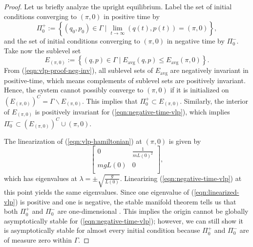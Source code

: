 \begin{proof}
   Let us briefly analyze the upright equilibrium.
   Label the set of initial conditions converging to \((\pi, 0)\) in
   positive time by
   \[
      \Pi_0^+ := \left\{ (q_0,p_0) \in \Gamma \mid \lim_{t \to \infty} (q(t),p(t)) = (\pi, 0) \right\}
      ,
   \]
   and the set of initial conditions converging to \((\pi,0)\)
   in negative time by \(\Pi_0^-\).
   Take now the sublevel set
   \[
      E_{(\pi,0)} := \left\{ (q,p) \in \Gamma \mid E_\text{avg}(q,p) \leq
         E_\text{avg}(\pi,0) \right\}
      .
   \] 
   From (\ref{eqn:vlp-proof-neg-inv}), all sublevel sets of \(E_\text{avg}\) are
   negatively invariant in positive-time, which means
   complements of sublevel sets are positively invariant.
   Hence, the system cannot possibly converge to \((\pi,0)\) if it is
   initialized on 
   \(\left(E_{(\pi,0)}\right)^C = \Gamma \backslash E_{(\pi,0)}\).
   This implies that \(\Pi_0^+ \subset E_{(\pi,0)}\).
   Similarly, the interior of \(E_{(\pi,0)}\) is positively
   invariant for (\ref{eqn:negative-time-vlp}), 
   which implies \(\Pi_0^- \subset \left(E_{(\pi,0)}\right)^C \cup (\pi,0)\).

   The linearization of (\ref{eqn:vlp-hamiltonian}) at \((\pi, 0)\) is given by
   \begin{equation}\label{eqn:linearized-vlp}
      \begin{bmatrix}
         0 & \frac{1}{mL(0)^2} \\
         m g L(0) & 0 \\
      \end{bmatrix}
      ,
   \end{equation}
   which has eigenvalues at \(\lambda = \pm \sqrt{\frac{g}{L(0)}}\).
   Linearizing (\ref{eqn:negative-time-vlp}) at this point yields the same eigenvalues.
   Since one eigenvalue of (\ref{eqn:linearized-vlp})
   is positive and one is negative, the stable manifold theorem tells
   us that both \(\Pi_0^+\) and \(\Pi_0^-\) are one-dimensional
   \cite{stable_manifold}.
   This implies the origin cannot be globally asymptotically stable for
   (\ref{eqn:negative-time-vlp}); however, we can still show it is asymptotically stable
   for almost every initial condition because \(\Pi_0^+\) and \(\Pi_0^-\) are of
   measure zero within \(\Gamma\).


\end{proof}
